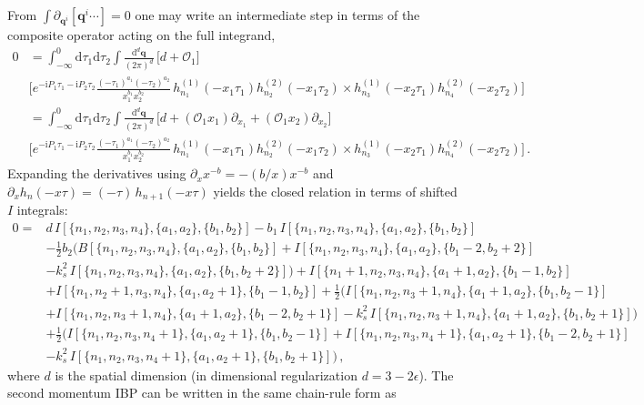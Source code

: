 \documentclass[%
 reprint,
 amsmath,amssymb,
 aps,
prd,
]{revtex4-2}
\def\di{{\mathrm{d}}}
\def\pd{\partial}
\def\ii{\mathrm{i}}
\def\ep{\epsilon}
\begin{document}
\begin{widetext}
From $\int \pd_{\bm q^i}[\bm q^i \cdots ]=0$ one may write an intermediate step in terms of the composite operator acting on the full integrand,
\begin{align}
	0 &= \int_{-\infty}^0 \di\tau_1\di\tau_2\int \frac{\di^d \bm q}{(2\pi)^d}\,
	\Big[d+\mathcal{O}_1\Big] \nonumber\\ 
	& \Bigg[
	e^{-\ii P_1\tau_1-\ii P_2\tau_2}
	\frac{(-\tau_1)^{a_1}(-\tau_2)^{a_2}}{x_1^{b_1}x_2^{b_2}}\,
	h_{n_1}^{(1)}(-x_1\tau_1)h_{n_2}^{(2)}(-x_1\tau_2) \times h_{n_3}^{(1)}(-x_2\tau_1)h_{n_4}^{(2)}(-x_2\tau_2)\Bigg] \nonumber\\
	& =  \int_{-\infty}^0 \di\tau_1\di\tau_2\int \frac{\di^d \bm q}{(2\pi)^d}\,
	\Bigg[d+(\mathcal{O}_1 x_1)\partial_{x_1} +(\mathcal{O}_1 x_2)\partial_{x_2}\Bigg] \nonumber\\
	&\Bigg[
	e^{-\ii P_1\tau_1-\ii P_2\tau_2}
	\frac{(-\tau_1)^{a_1}(-\tau_2)^{a_2}}{x_1^{b_1}x_2^{b_2}}\,
	h_{n_1}^{(1)}(-x_1\tau_1)h_{n_2}^{(2)}(-x_1\tau_2)
	  \times h_{n_3}^{(1)}(-x_2\tau_1)h_{n_4}^{(2)}(-x_2\tau_2)\Bigg]\,. \label{eq:momIBP_qdot_chainrule}
\end{align}
Expanding the derivatives using $\partial_x x^{-b}=-(b/x)x^{-b}$ and $\partial_x h_n(-x\tau)=(-\tau)\,h_{n+1}(-x\tau)$ yields the closed relation in terms of shifted $I$ integrals:
\begin{align}
	0 =& d\,I[\{n_1,n_2,n_3,n_4\},\{a_1,a_2\},\{b_1,b_2\}] - b_1\,I[\{n_1,n_2,n_3,n_4\},\{a_1,a_2\},\{b_1,b_2\}] \nonumber \\
	&- \frac12 b_2\Big(
	B[\{n_1,n_2,n_3,n_4\},\{a_1,a_2\},\{b_1,b_2\}]  + I[\{n_1,n_2,n_3,n_4\},\{a_1,a_2\},\{b_1-2,b_2+2\}] \nonumber\\
	&-k_s^2\,I[\{n_1,n_2,n_3,n_4\},\{a_1,a_2\},\{b_1,b_2+2\}]
	\Big) +I[\{n_1+1,n_2,n_3,n_4\},\{a_1+1,a_2\},\{b_1-1,b_2\}] \nonumber\\
	&+ I[\{n_1,n_2+1,n_3,n_4\},\{a_1,a_2+1\},\{b_1-1,b_2\}] +\frac12 \Big(
	I[\{n_1,n_2,n_3+1,n_4\},\{a_1+1,a_2\},\{b_1,b_2-1\}] \nonumber\\
	&+ I[\{n_1,n_2,n_3+1,n_4\},\{a_1+1,a_2\},\{b_1-2,b_2+1\}]-k_s^2\,I[\{n_1,n_2,n_3+1,n_4\},\{a_1+1,a_2\},\{b_1,b_2+1\}]
	\Big) \nonumber \\
	&+\frac12\Big(
	I[\{n_1,n_2,n_3,n_4+1\},\{a_1,a_2+1\},\{b_1,b_2-1\}]+ I[\{n_1,n_2,n_3,n_4+1\},\{a_1,a_2+1\},\{b_1-2,b_2+1\}] \nonumber\\
	&-k_s^2\,I[\{n_1,n_2,n_3,n_4+1\},\{a_1,a_2+1\},\{b_1,b_2+1\}]
	\Big)\,,
\label{eq:momIBP_qdot}
\end{align}
where $d$ is the spatial dimension (in dimensional regularization $d=3-2\ep$). The second momentum IBP can be written in the same chain-rule form as

\end{widetext}
\end{document}
